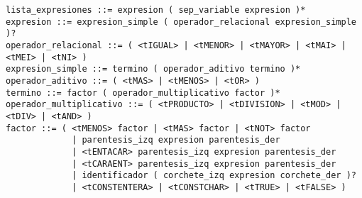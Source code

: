 \begin{Verbatim}[fontsize=\small]
lista_expresiones ::= expresion ( sep_variable expresion )*
expresion ::= expresion_simple ( operador_relacional expresion_simple )?
operador_relacional ::= ( <tIGUAL> | <tMENOR> | <tMAYOR> | <tMAI> | <tMEI> | <tNI> )
expresion_simple ::= termino ( operador_aditivo termino )*
operador_aditivo ::= ( <tMAS> | <tMENOS> | <tOR> )
termino ::= factor ( operador_multiplicativo factor )*
operador_multiplicativo ::= ( <tPRODUCTO> | <tDIVISION> | <tMOD> | <tDIV> | <tAND> )
factor ::= ( <tMENOS> factor | <tMAS> factor | <tNOT> factor
             | parentesis_izq expresion parentesis_der
             | <tENTACAR> parentesis_izq expresion parentesis_der
             | <tCARAENT> parentesis_izq expresion parentesis_der
             | identificador ( corchete_izq expresion corchete_der )?
             | <tCONSTENTERA> | <tCONSTCHAR> | <tTRUE> | <tFALSE> )
\end{Verbatim}
